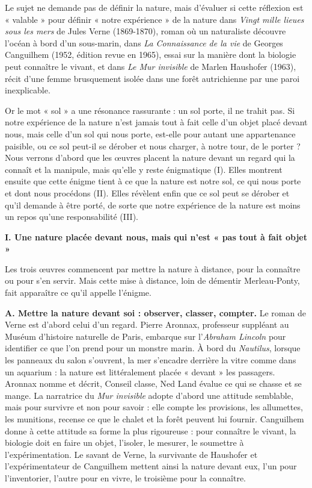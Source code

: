 \documentclass[11pt,a4paper]{article}
\begin{document}
Le sujet ne demande pas de définir la nature, mais d'évaluer si cette réflexion est « valable » pour définir « notre expérience » de la nature dans \emph{Vingt mille lieues sous les mers} de Jules Verne (1869-1870), roman où un naturaliste découvre l'océan à bord d'un sous-marin, dans \emph{La Connaissance de la vie} de Georges Canguilhem (1952, édition revue en 1965), essai sur la manière dont la biologie peut connaître le vivant, et dans \emph{Le Mur invisible} de Marlen Haushofer (1963), récit d'une femme brusquement isolée dans une forêt autrichienne par une paroi inexplicable.

Or le mot « sol » a une résonance rassurante : un sol porte, il ne trahit pas. Si notre expérience de la nature n'est jamais tout à fait celle d'un objet placé devant nous, mais celle d'un sol qui nous porte, est-elle pour autant une appartenance paisible, ou ce sol peut-il se dérober et nous charger, à notre tour, de le porter ? Nous verrons d'abord que les œuvres placent la nature devant un regard qui la connaît et la manipule, mais qu'elle y reste énigmatique (I). Elles montrent ensuite que cette énigme tient à ce que la nature est notre sol, ce qui nous porte et dont nous procédons (II). Elles révèlent enfin que ce sol peut se dérober et qu'il demande à être porté, de sorte que notre expérience de la nature est moins un repos qu'une responsabilité (III).

\textbf{I. Une nature placée devant nous, mais qui n'est « pas tout à fait objet »}

Les trois œuvres commencent par mettre la nature à distance, pour la connaître ou pour s'en servir. Mais cette mise à distance, loin de démentir Merleau-Ponty, fait apparaître ce qu'il appelle l'énigme.

\textbf{A. Mettre la nature devant soi : observer, classer, compter.} Le roman de Verne est d'abord celui d'un regard. Pierre Aronnax, professeur suppléant au Muséum d'histoire naturelle de Paris, embarque sur l'\emph{Abraham Lincoln} pour identifier ce que l'on prend pour un monstre marin. À bord du \emph{Nautilus}, lorsque les panneaux du salon s'ouvrent, la mer s'encadre derrière la vitre comme dans un aquarium : la nature est littéralement placée « devant » les passagers. Aronnax nomme et décrit, Conseil classe, Ned Land évalue ce qui se chasse et se mange. La narratrice du \emph{Mur invisible} adopte d'abord une attitude semblable, mais pour survivre et non pour savoir : elle compte les provisions, les allumettes, les munitions, recense ce que le chalet et la forêt peuvent lui fournir. Canguilhem donne à cette attitude sa forme la plus rigoureuse : pour connaître le vivant, la biologie doit en faire un objet, l'isoler, le mesurer, le soumettre à l'expérimentation. Le savant de Verne, la survivante de Haushofer et l'expérimentateur de Canguilhem mettent ainsi la nature devant eux, l'un pour l'inventorier, l'autre pour en vivre, le troisième pour la connaître.
\end{document}
